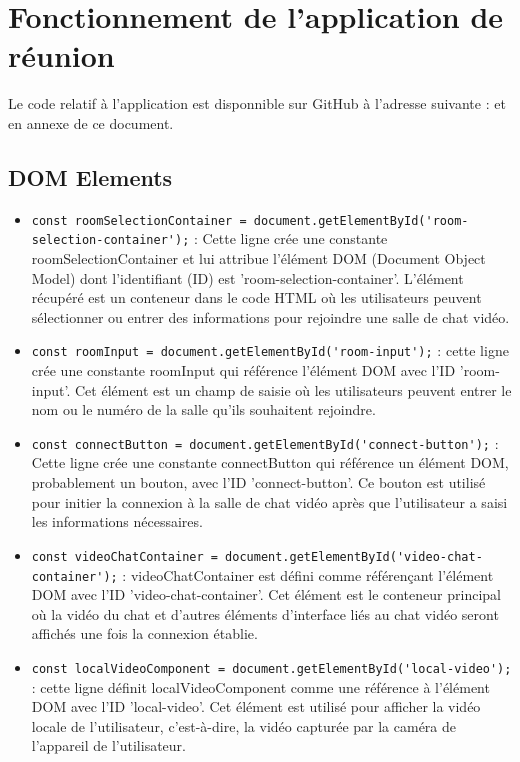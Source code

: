 \documentclass[12pt, a4paper, oneside]{thesis}
\begin{document}
\newpage

\section{Fonctionnement de l'application de réunion}

Le code relatif à l'application est disponnible sur GitHub à l'adresse suivante : et en annexe de ce document.

\subsection{DOM Elements}

\begin{itemize}
  \item \verb|const roomSelectionContainer = document.getElementById('room-selection-container');| : Cette ligne crée une constante roomSelectionContainer et lui attribue l'élément DOM (Document Object Model) dont l'identifiant (ID) est 'room-selection-container'. L'élément récupéré est un conteneur dans le code HTML où les utilisateurs peuvent sélectionner ou entrer des informations pour rejoindre une salle de chat vidéo.
  \item \verb|const roomInput = document.getElementById('room-input');| : cette ligne crée une constante roomInput qui référence l'élément DOM avec l'ID 'room-input'. Cet élément est un champ de saisie où les utilisateurs peuvent entrer le nom ou le numéro de la salle qu'ils souhaitent rejoindre.
  \item \verb|const connectButton = document.getElementById('connect-button');| :  Cette ligne crée une constante connectButton qui référence un élément DOM, probablement un bouton, avec l'ID 'connect-button'. Ce bouton est utilisé pour initier la connexion à la salle de chat vidéo après que l'utilisateur a saisi les informations nécessaires.
  \item \verb|const videoChatContainer = document.getElementById('video-chat-container');| : videoChatContainer est défini comme référençant l'élément DOM avec l'ID 'video-chat-container'. Cet élément est le conteneur principal où la vidéo du chat et d'autres éléments d'interface liés au chat vidéo seront affichés une fois la connexion établie.
  \item \verb|const localVideoComponent = document.getElementById('local-video');| :  cette ligne définit localVideoComponent comme une référence à l'élément DOM avec l'ID 'local-video'. Cet élément est utilisé pour afficher la vidéo locale de l'utilisateur, c'est-à-dire, la vidéo capturée par la caméra de l'appareil de l'utilisateur.
\end{itemize}
\end{document}
